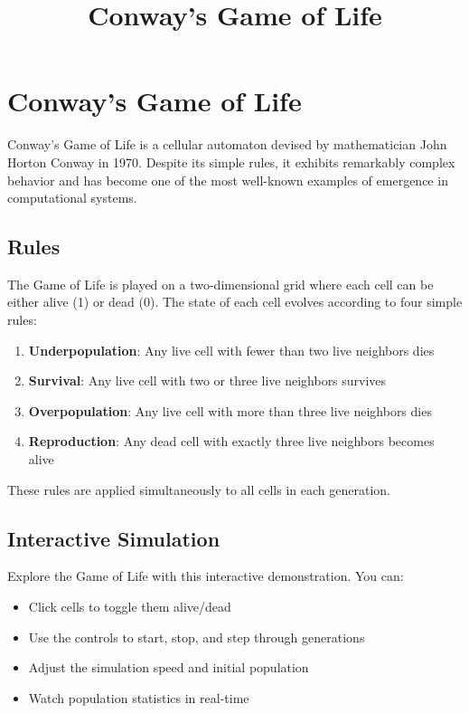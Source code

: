 \documentclass{article}
\title{Conway's Game of Life}
\begin{document}
\section{Conway's Game of Life}

Conway's Game of Life is a cellular automaton devised by mathematician John Horton Conway in 1970. Despite its simple rules, it exhibits remarkably complex behavior and has become one of the most well-known examples of emergence in computational systems.

\subsection{Rules}

The Game of Life is played on a two-dimensional grid where each cell can be either alive (1) or dead (0). The state of each cell evolves according to four simple rules:

\begin{enumerate}
\item \textbf{Underpopulation}: Any live cell with fewer than two live neighbors dies
\item \textbf{Survival}: Any live cell with two or three live neighbors survives
\item \textbf{Overpopulation}: Any live cell with more than three live neighbors dies
\item \textbf{Reproduction}: Any dead cell with exactly three live neighbors becomes alive
\end{enumerate}

These rules are applied simultaneously to all cells in each generation.

\subsection{Interactive Simulation}

Explore the Game of Life with this interactive demonstration. You can:

\begin{itemize}
\item Click cells to toggle them alive/dead
\item Use the controls to start, stop, and step through generations
\item Adjust the simulation speed and initial population
\item Watch population statistics in real-time
\end{itemize}
\end{document}
